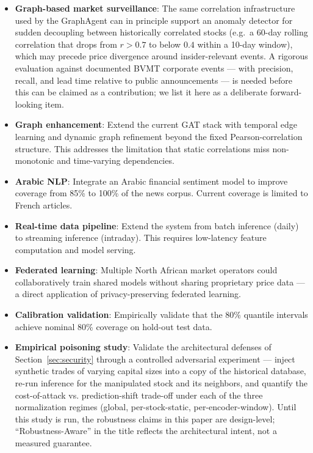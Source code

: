 \documentclass[conference]{IEEEtran}
\begin{document}
\begin{itemize}
\item \textbf{Graph-based market surveillance}: The same correlation infrastructure used by the GraphAgent can in principle support an anomaly detector for sudden decoupling between historically correlated stocks (e.g.\ a 60-day rolling correlation that drops from $r > 0.7$ to below $0.4$ within a 10-day window), which may precede price divergence around insider-relevant events. A rigorous evaluation against documented BVMT corporate events --- with precision, recall, and lead time relative to public announcements --- is needed before this can be claimed as a contribution; we list it here as a deliberate forward-looking item.

\item \textbf{Graph enhancement}: Extend the current GAT stack with temporal edge learning and dynamic graph refinement beyond the fixed Pearson-correlation structure. This addresses the limitation that static correlations miss non-monotonic and time-varying dependencies.

\item \textbf{Arabic NLP}: Integrate an Arabic financial sentiment model to improve coverage from 85\% to 100\% of the news corpus. Current coverage is limited to French articles.

\item \textbf{Real-time data pipeline}: Extend the system from batch inference (daily) to streaming inference (intraday). This requires low-latency feature computation and model serving.

\item \textbf{Federated learning}: Multiple North African market operators could collaboratively train shared models without sharing proprietary price data — a direct application of privacy-preserving federated learning.

\item \textbf{Calibration validation}: Empirically validate that the 80\% quantile intervals achieve nominal 80\% coverage on hold-out test data.

\item \textbf{Empirical poisoning study}: Validate the architectural defenses of Section~\ref{sec:security} through a controlled adversarial experiment --- inject synthetic trades of varying capital sizes into a copy of the historical database, re-run inference for the manipulated stock and its neighbors, and quantify the cost-of-attack vs. prediction-shift trade-off under each of the three normalization regimes (global, per-stock-static, per-encoder-window). Until this study is run, the robustness claims in this paper are design-level; ``Robustness-Aware'' in the title reflects the architectural intent, not a measured guarantee.
\end{itemize}
\end{document}
